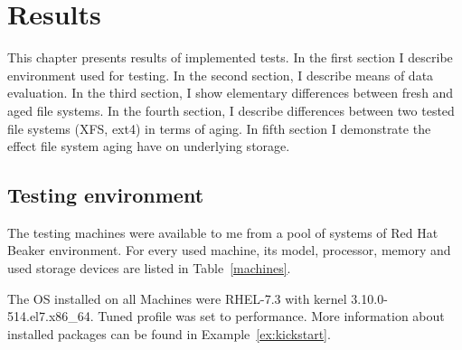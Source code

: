\documentclass[
  color, %
  table, %
  lof,   %
  lot,   %
]{fithesis3}
\begin{document}
\chapter{Results}
\label{results}
This chapter presents results of implemented tests. In the first section I describe environment used for testing. In the second section, I describe means of data evaluation. In the third section, I show elementary differences between fresh and aged file systems. In the fourth section, I describe differences between two tested file systems (XFS, ext4) in terms of aging. In fifth section I demonstrate the effect file system aging have on underlying storage.

\section{Testing environment}
\label{env}
The testing machines were available to me from a pool of systems of Red Hat Beaker environment. For every used machine, its model, processor, memory and used storage devices are listed in Table~\ref{machines}.

The OS installed on all Machines were RHEL-7.3 with kernel 3.10.0-514.el7.x86\_64. Tuned profile was set to performance. More information about installed packages can be found in Example~\ref{ex:kickstart}.

\clearpage
\end{document}
